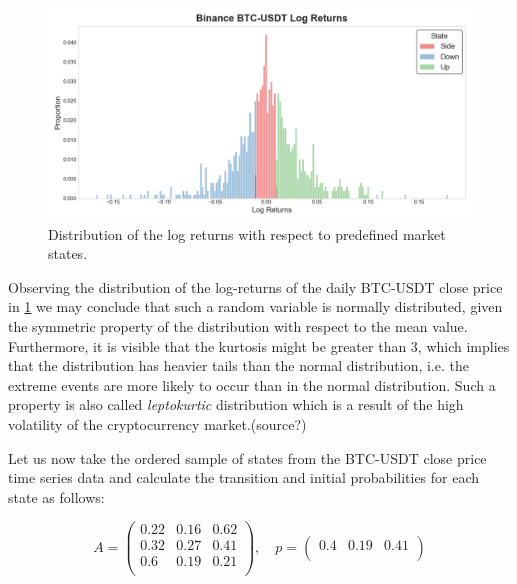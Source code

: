 \begin{figure}[htbp]
    \begin{center}
        \includegraphics[width=1.0\textwidth]{Figs/BTC-USD_hist.png}
        \caption{Distribution of the log returns with respect to predefined market states. \cite{tradingview}}
        \label{fig:BTC-USD-distribution}
    \end{center}
\end{figure}

Observing the distribution of the log-returns of the daily BTC-USDT close price in \ref{fig:BTC-USD-distribution} we may conclude that such a random variable is normally distributed,
given the symmetric property of the distribution with respect to the mean value. Furthermore, it is visible that the kurtosis might be greater than 3,
which implies that the distribution has heavier tails than the normal distribution, i.e. the extreme events are more likely to occur than in the normal distribution.
Such a property is also called {\it leptokurtic} distribution which is a result of the high volatility of the cryptocurrency market.(source?)

Let us now take the ordered sample of states from the BTC-USDT close price time series data and calculate 
the transition and initial probabilities for each state as follows:

\begin{equation}
    A = \begin{pmatrix}
     0.22 & 0.16 & 0.62 \\
     0.32 & 0.27 & 0.41 \\
     0.6 & 0.19 & 0.21 \\
     \end{pmatrix}
     , \quad 
     p= \begin{pmatrix}
     0.4 & 0.19 & 0.41 \\
     \end{pmatrix}
 \end{equation}

